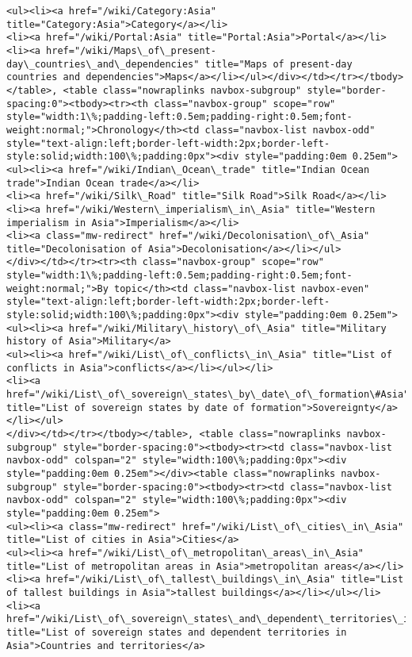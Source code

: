 \documentclass[11pt]{article}
\begin{document}
\begin{Verbatim}[commandchars=\\\{\}]
<ul><li><a href="/wiki/Category:Asia" title="Category:Asia">Category</a></li>
<li><a href="/wiki/Portal:Asia" title="Portal:Asia">Portal</a></li>
<li><a href="/wiki/Maps\_of\_present-day\_countries\_and\_dependencies" title="Maps of present-day countries and dependencies">Maps</a></li></ul></div></td></tr></tbody></table>, <table class="nowraplinks navbox-subgroup" style="border-spacing:0"><tbody><tr><th class="navbox-group" scope="row" style="width:1\%;padding-left:0.5em;padding-right:0.5em;font-weight:normal;">Chronology</th><td class="navbox-list navbox-odd" style="text-align:left;border-left-width:2px;border-left-style:solid;width:100\%;padding:0px"><div style="padding:0em 0.25em">
<ul><li><a href="/wiki/Indian\_Ocean\_trade" title="Indian Ocean trade">Indian Ocean trade</a></li>
<li><a href="/wiki/Silk\_Road" title="Silk Road">Silk Road</a></li>
<li><a href="/wiki/Western\_imperialism\_in\_Asia" title="Western imperialism in Asia">Imperialism</a></li>
<li><a class="mw-redirect" href="/wiki/Decolonisation\_of\_Asia" title="Decolonisation of Asia">Decolonisation</a></li></ul>
</div></td></tr><tr><th class="navbox-group" scope="row" style="width:1\%;padding-left:0.5em;padding-right:0.5em;font-weight:normal;">By topic</th><td class="navbox-list navbox-even" style="text-align:left;border-left-width:2px;border-left-style:solid;width:100\%;padding:0px"><div style="padding:0em 0.25em">
<ul><li><a href="/wiki/Military\_history\_of\_Asia" title="Military history of Asia">Military</a>
<ul><li><a href="/wiki/List\_of\_conflicts\_in\_Asia" title="List of conflicts in Asia">conflicts</a></li></ul></li>
<li><a href="/wiki/List\_of\_sovereign\_states\_by\_date\_of\_formation\#Asia" title="List of sovereign states by date of formation">Sovereignty</a></li></ul>
</div></td></tr></tbody></table>, <table class="nowraplinks navbox-subgroup" style="border-spacing:0"><tbody><tr><td class="navbox-list navbox-odd" colspan="2" style="width:100\%;padding:0px"><div style="padding:0em 0.25em"></div><table class="nowraplinks navbox-subgroup" style="border-spacing:0"><tbody><tr><td class="navbox-list navbox-odd" colspan="2" style="width:100\%;padding:0px"><div style="padding:0em 0.25em">
<ul><li><a class="mw-redirect" href="/wiki/List\_of\_cities\_in\_Asia" title="List of cities in Asia">Cities</a>
<ul><li><a href="/wiki/List\_of\_metropolitan\_areas\_in\_Asia" title="List of metropolitan areas in Asia">metropolitan areas</a></li>
<li><a href="/wiki/List\_of\_tallest\_buildings\_in\_Asia" title="List of tallest buildings in Asia">tallest buildings</a></li></ul></li>
<li><a href="/wiki/List\_of\_sovereign\_states\_and\_dependent\_territories\_in\_Asia" title="List of sovereign states and dependent territories in Asia">Countries and territories</a>

\end{Verbatim}
\end{document}
